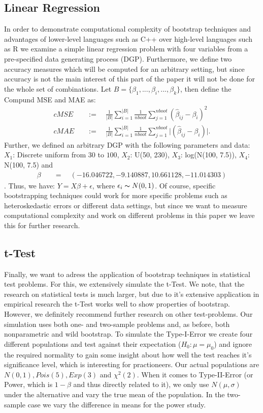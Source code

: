 \subsection{Linear Regression}
In order to demonstrate computational complexity of bootstrap techniques and advantages of lower-level languages such as C++ over high-level languages such as R we examine a simple linear regression problem with four variables from a pre-specified data generating process (DGP). Furthermore, we define two accuracy measures which will be computed for an arbitrary setting, but since accuracy is not the main interest of this part of the paper it will not be done for the whole set of combinations. Let $B  = \{\beta_1, ..., \beta_i, ..., \beta_k\}$, then define the Compund MSE and MAE as:
\begin{align*}
cMSE \quad &:= \quad \frac{1}{\lvert B \rvert} \sum_{i = 1}^{\lvert B \rvert} \frac{1}{nboot} \sum_{j = 1}^{nboot} (\hat{\beta}_{ij} - \beta_i)^2 \\
cMAE \quad &:= \quad \frac{1}{\lvert B \rvert} \sum_{i = 1}^{\lvert B \rvert} \frac{1}{nboot} \sum_{j = 1}^{nboot} \lvert (\hat{\beta}_{ij} - \beta_i) \rvert.
\end{align*}
Further, we defined an arbitrary DGP with the following parameters and data: $X_1$: Discrete uniform from $30$ to $100$, $X_2$: U(50, 230), $X_3$: log(N(100, 7.5)), $X_4$: N(100, 7.5) and \begin{align*}
\beta \quad  &= \quad (-16.046722, -9.140887, 10.661128, -11.014303)
\end{align*}. Thus, we have: $Y = X\beta + \epsilon$, where $\epsilon_i \thicksim N(0,1)$. Of course, specific bootstrapping techniques could work for more specific problems such as heteroskedastic errors or different data settings, but since we want to measure computational complexity and work on different problems in this paper we leave this for further research.

\subsection{t-Test}
Finally, we want to adress the application of bootstrap techniques in statistical test problems. For this, we extensively simulate the t-Test. We note, that the research on statistical tests is much larger, but due to it's extensive application in empirical research the t-Test works well to show properties of bootstrap. However, we definitely recommend further research on other test-problems. Our simulation uses both one- and two-sample problems and, as before, both nonparametric and wild bootstrap. To simulate the Type-I-Error we create four different populations and test against their expectation ($H_0: \mu = \mu_0$) and ignore the required normality to gain some insight about how well the test reaches it's significance level, which is interesting for practioneers. Our actual populations are $N(0,1), Pois(5), Exp(3)$ and $\chi^2(2)$. When it comes to Type-II-Error (or Power, which is $1-\beta$ and thus directly related to it), we only use $N(\mu, \sigma)$ under the alternative and vary the true mean of the population. In the two-sample case we vary the difference in means for the power study. 